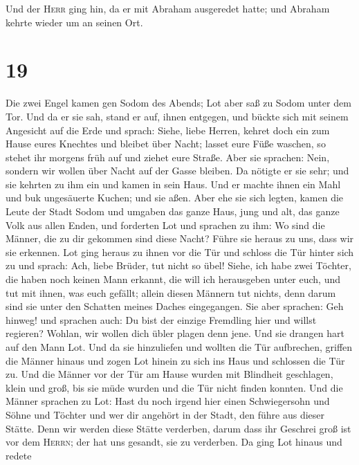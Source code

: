  Und der \textsc{Herr} ging hin, da er mit Abraham
ausgeredet hatte; und Abraham kehrte wieder um an seinen Ort.

\hypertarget{section-18}{%
\section{19}\label{section-18}}

 Die zwei Engel kamen gen Sodom des Abends; Lot aber saß
zu Sodom unter dem Tor. Und da er sie sah, stand er auf, ihnen entgegen,
und bückte sich mit seinem Angesicht auf die Erde  und
sprach: Siehe, liebe Herren, kehret doch ein zum Hause eures Knechtes
und bleibet über Nacht; lasset eure Füße waschen, so stehet ihr morgens
früh auf und ziehet eure Straße. Aber sie sprachen: Nein, sondern wir
wollen über Nacht auf der Gasse bleiben.  Da nötigte er
sie sehr; und sie kehrten zu ihm ein und kamen in sein Haus. Und er
machte ihnen ein Mahl und buk ungesäuerte Kuchen; und sie aßen.
 Aber ehe sie sich legten, kamen die Leute der Stadt Sodom
und umgaben das ganze Haus, jung und alt, das ganze Volk aus allen
Enden,  und forderten Lot und sprachen zu ihm: Wo sind die
Männer, die zu dir gekommen sind diese Nacht? Führe sie heraus zu uns,
dass wir sie erkennen.  Lot ging heraus zu ihnen vor die
Tür und schloss die Tür hinter sich zu  und sprach: Ach,
liebe Brüder, tut nicht so übel!  Siehe, ich habe zwei
Töchter, die haben noch keinen Mann erkannt, die will ich herausgeben
unter euch, und tut mit ihnen, was euch gefällt; allein diesen Männern
tut nichts, denn darum sind sie unter den Schatten meines Daches
eingegangen.  Sie aber sprachen: Geh hinweg! und sprachen
auch: Du bist der einzige Fremdling hier und willst regieren? Wohlan,
wir wollen dich übler plagen denn jene. Und sie drangen hart auf den
Mann Lot. Und da sie hinzuliefen und wollten die Tür aufbrechen,
 griffen die Männer hinaus und zogen Lot hinein zu sich
ins Haus und schlossen die Tür zu.  Und die Männer vor
der Tür am Hause wurden mit Blindheit geschlagen, klein und groß, bis
sie müde wurden und die Tür nicht finden konnten.  Und
die Männer sprachen zu Lot: Hast du noch irgend hier einen Schwiegersohn
und Söhne und Töchter und wer dir angehört in der Stadt, den führe aus
dieser Stätte.  Denn wir werden diese Stätte verderben,
darum dass ihr Geschrei groß ist vor dem \textsc{Herrn}; der hat uns
gesandt, sie zu verderben.  Da ging Lot hinaus und redete
